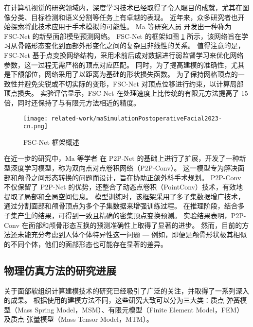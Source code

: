 在计算机视觉的研究领域内，深度学习技术已经取得了令人瞩目的成就，尤其在图像分类、目标检测和语义分割等任务上有卓越的表现。
近年来，众多研究者也开始探索将此技术应用于手术模拟的可能性。
Ma 等研究人员 \cite{maSimulationPostoperativeFacial2023} 开发出一种称为 FSC-Net 的新型面部模型预测网络。
FSC-Net 的框架如图 \ref{fig:maBidirectionalPredictionFacial2023} 所示，该网络旨在学习从骨骼形态变化到面部外形变化之间的复杂且非线性的关系。
值得注意的是，FSC-Net 基于点变换网络结构，采用术前后成对数据进行弱监督学习来优化网络参数，这一过程无需严格的顶点对应匹配。
同时，为了提高建模的准确性，尤其是下颌部位，网络采用了以距离为基础的形状损失函数。
为了保持网格顶点的一致性并避免尖锐或不切实际的变形，FSC-Net 对顶点位移进行约束，以计算局部顶点损失。
实验评估显示，FSC-Net 在处理速度上比传统的有限元方法提高了 15 倍，同时还保持了与有限元方法相近的精度。

\begin{figure}
  \centering
  \texttt{[image: related-work/maSimulationPostoperativeFacial2023-cn.png]}
  \caption{
    FSC-Net 框架概述 \cite{maBidirectionalPredictionFacial2023}
  }
  \label{fig:maBidirectionalPredictionFacial2023}
\end{figure}

在近一步的研究中，Ma 等学者 \cite{maBidirectionalPredictionFacial2023} 在 P2P-Net \cite{yinP2PNETBidirectionalPoint2018} 的基础上进行了扩展，开发了一种新型深度学习模型，称为双向点对点卷积网络（P2P-Conv）。
这一模型专为解决面部和颅骨之间形态转换的问题而设计，旨在协助正颌外科手术规划。
P2P-Conv 不仅保留了 P2P-Net 的优势，还整合了动态点卷积（PointConv）技术，有效地提取了局部和全局空间信息。
模型训练时，该框架采用了多子集数据增广技术，通过分割面部和颅骨顶点为多个子集数据来增强训练过程。
在推理阶段，结合多子集产生的结果，可得到一致且精确的密集顶点变换预测。
实验结果表明，P2P-Conv 在面部和颅骨形态互换的预测准确性上取得了显著的进步。
然而，目前的方法还未能充分考虑到人体个体特异性这一问题 --- 例如，即便是颅骨形状极其相似的不同个体，他们的面部形态也可能存在显著的差异。

\subsection{物理仿真方法的研究进展}

关于面部软组织计算建模技术的研究已经吸引了广泛的关注，并取得了一系列深入的成果。
根据使用的建模方法不同，这些研究大致可以分为三大类：质点-弹簧模型（Mass Spring Model，MSM）、有限元模型（Finite Element Model，FEM）及质点-张量模型（Mass Tensor Model，MTM）。

